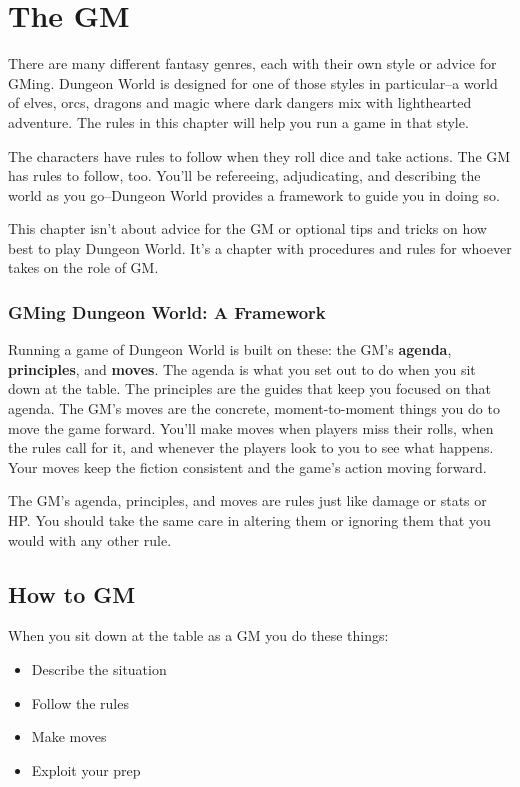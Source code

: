 \chapter{The GM}


 There are many different fantasy genres, each with their own style or advice for GMing. Dungeon World is designed for one of those styles in particular--a world of elves, orcs, dragons and magic where dark dangers mix with lighthearted adventure. The rules in this chapter will help you run a game in that style.


 The characters have rules to follow when they roll dice and take actions. The GM has rules to follow, too. You'll be refereeing, adjudicating, and describing the world as you go--Dungeon World provides a framework to guide you in doing so.


 This chapter isn't about advice for the GM or optional tips and tricks on how best to play Dungeon World. It's a chapter with procedures and rules for whoever takes on the role of GM.
\subsection{GMing Dungeon World: A Framework}


 Running a game of Dungeon World is built on these: the GM's \textbf{agenda}, \textbf{principles}, and \textbf{moves}. The agenda is what you set out to do when you sit down at the table. The principles are the guides that keep you focused on that agenda. The GM's moves are the concrete, moment-to-moment things you do to move the game forward. You'll make moves when players miss their rolls, when the rules call for it, and whenever the players look to you to see what happens. Your moves keep the fiction consistent and the game's action moving forward.


 The GM's agenda, principles, and moves are rules just like damage or stats or HP\@. You should take the same care in altering them or ignoring them that you would with any other rule.
\section*{How to GM}


 When you sit down at the table as a GM you do these things:
\begin{itemize}
\item Describe the situation
\item Follow the rules
\item Make moves
\item Exploit your prep

\end{itemize}


